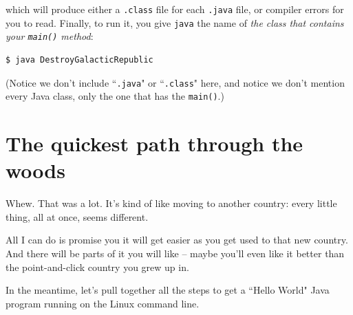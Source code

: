 \begin{enumerate}
which will produce either a \texttt{.class} file for each \texttt{.java} file,
or compiler errors for you to read. Finally, to run it, you give \texttt{java}
the name of \textit{the class that contains your \texttt{main()} method}:

\begin{verbatim}
$ java DestroyGalacticRepublic
\end{verbatim}

(Notice we don't include ``\texttt{.java}" or ``\texttt{.class}" here, and
notice we don't mention every Java class, only the one that has the
\texttt{main()}.)

\end{enumerate}

\section{The quickest path through the woods}

Whew. That was a lot. It's kind of like moving to another country: every
little thing, all at once, seems different.

All I can do is promise you it will get easier as you get used to that new
country. And there will be parts of it you will like -- maybe you'll even like
it better than the point-and-click country you grew up in.

In the meantime, let's pull together all the steps to get a ``Hello World"
Java program running on the Linux command line.

